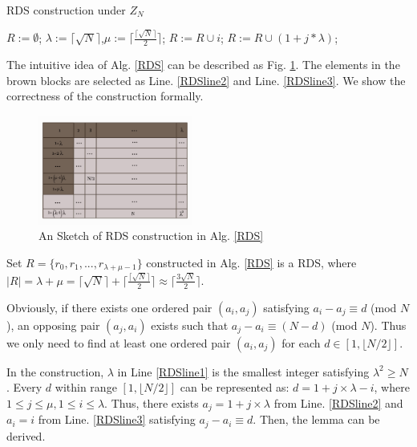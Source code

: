 \begin{algorithm}[!h]
\caption{RDS construction under $Z_N$}
\label{RDS}
\begin{algorithmic}[1]
\STATE $R :=\emptyset$; $\lambda :=\lceil \sqrt{N}  \rceil$,$\mu :=\lceil \frac{\lceil \sqrt{N} \rceil}{2} \rceil$;\label{RDSline1}
	\STATE $R :=R \cup i$; \label{RDSline2}
\ENDFOR
{}
	\STATE $R :=R \cup (1 + j * \lambda )$; \label{RDSline3}
\ENDFOR
\end{algorithmic}
\end{algorithm}


The intuitive idea of Alg. \ref{RDS} can be described as Fig. \ref{matrix}.
The elements in the brown blocks are selected as Line. \ref{RDSline2} and Line. \ref{RDSline3}.
We show the correctness of the construction formally.

\begin{figure}[!h]
\centering
\includegraphics[width=2in]{./Figure/matrix}
\caption{An Sketch of RDS construction in Alg. \ref{RDS}}
\label{matrix}
\end{figure}


\begin{lemma}
\label{RDS1}
Set $R = \{r_0, r_1, ..., r_{\lambda + \mu - 1}\}$ constructed in Alg. \ref{RDS} is a RDS,
where $|R| = \lambda + \mu = \lceil \sqrt{N}  \rceil + \lceil \frac{\lceil \sqrt{N} \rceil}{2} \rceil
\approx \lceil \frac{3\sqrt{N}}{2}  \rceil$.
\end{lemma}


\begin{IEEEproof}
Obviously, if there exists one ordered pair $(a_i,a_j)$ satisfying  $a_i - a_j \equiv d$ (mod $N$),
an opposing pair $(a_j,a_i)$ exists such that
$a_j - a_i \equiv (N-d)$ (mod $N$). Thus we only need to find
at least one ordered pair $(a_i,a_j)$ for each $d \in [1, \lfloor N/2 \rfloor]$.

In the construction, $\lambda$ in Line \ref{RDSline1} is the smallest integer satisfying
$\lambda^2 \geq N$. Every $d$ within range $[1, \lfloor N/2 \rfloor]$
can be represented as: $ d = 1 + j \times \lambda - i$, where $1 \leq j \leq \mu,
1 \leq i \leq \lambda$. Thus, there exists $a_j = 1 + j \times \lambda$
from Line. \ref{RDSline2} and $a_i = i$ from Line. \ref{RDSline3}
satisfying  $a_j - a_i \equiv d$. Then, the lemma can be derived.
\end{IEEEproof}


